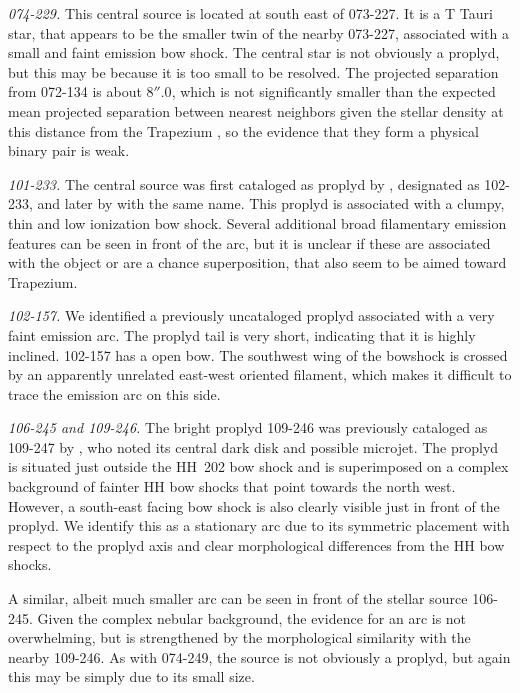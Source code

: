 \documentclass[apj, twocolumn]{aastex63}
\begin{document}
\textit{074-229.} This central source is located at south
east of 073-227. It is a T Tauri star, that appears to be
the smaller twin of the nearby 073-227, associated with a
small and faint emission bow shock. The central star is
not obviously a proplyd, but this may be because it is too
small to be resolved. The projected separation from 072-134
is about \(8''.0\), which is not significantly smaller than
the expected mean projected separation between nearest
neighbors given the stellar density at this distance from
the Trapezium \citep{Reipurth:2007a}, 
so the evidence that they form a physical binary pair is weak.

\textit{101-233.} The central source was first cataloged
as proplyd by \citet{ODell:1996a}, designated as 102-233,
and later by \citet{Ricci:2008a} with the same name. This
proplyd is associated with a clumpy, thin and low ionization
bow shock. Several additional broad filamentary emission
features can be seen in front of the arc, but it is unclear
if these are associated with the object or are a chance
superposition, that also seem to be aimed toward Trapezium. 

\textit{102-157.} We identified a previously uncataloged
proplyd associated with a very faint emission arc. The proplyd
tail is very short, indicating that it is highly inclined.
102-157 has a open bow. The southwest wing of the bowshock
is crossed by an apparently unrelated east-west oriented
filament, which makes it difficult to trace the emission
arc on this side.


\textit{106-245 and 109-246.} The bright proplyd 109-246
\citep{Ricci:2008a} was previously cataloged as 109-247 by
\citet{Bally:2000a}, who noted its central dark disk and
possible microjet.  The proplyd is situated just outside
the HH~202 bow shock and is superimposed on a complex
background of fainter HH bow shocks that point towards
the north west.  However, a south-east facing bow shock
is also clearly visible just in front of
the proplyd.  We identify this as a stationary arc due to its
symmetric placement with respect to the proplyd axis and clear
morphological differences from the HH bow shocks.

A similar, albeit much smaller arc can be seen in front of the
stellar source 106-245.  Given the complex nebular background,
the evidence for an arc is not overwhelming, but is strengthened
by the morphological similarity with the nearby 109-246.  As
with 074-249, the source is not obviously a proplyd, but again
this may be simply due to its small size.    
\end{document}

